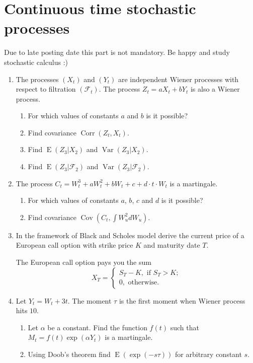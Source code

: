\documentclass[12pt]{article}
\DeclareMathOperator{\Cov}{Cov}
\DeclareMathOperator{\Corr}{Corr}
\DeclareMathOperator{\Var}{Var}
\DeclareMathOperator{\E}{E}
\begin{document}
\newpage
\section{Continuous time stochastic processes}

Due to late posting date this part is not mandatory. Be happy and study stochastic calculus :)

\begin{enumerate}

\item The processes $(X_t)$ and $(Y_t)$ are independent Wiener processes with respect to filtration $(\mathcal{F}_t)$.
The process $Z_t = aX_t + b Y_t$ is also a Wiener process. 
\begin{enumerate}
  \item For which values of constants $a$ and $b$ is it possible?
  \item Find covariance $\Corr(Z_t, X_t)$.
  \item Find $\E(Z_3 | X_2)$ and $\Var(Z_3 | X_2)$.
  \item Find $\E(Z_3 | \mathcal{F}_2)$ and $\Var(Z_3 | \mathcal{F}_2)$.
\end{enumerate}


\item The process $C_t = W_t^3 + aW_t^2 +b W_t + c + d\cdot t\cdot W_t$ is a martingale.
\begin{enumerate}
  \item For which values of constants $a$, $b$, $c$ and $d$ is it possible?
  \item Find covariance $\Cov(C_t, \int W^2_u dW_u)$.
\end{enumerate}

\item In the framework of Black and Scholes model derive the current price of a European call option with 
strike price $K$ and maturity date $T$. 

The European call option pays you the sum
\[
X_T =   \begin{cases}
S_T - K, \text{ if } S_T > K; \\
0, \text{ otherwise.}
\end{cases}
\]

\item Let $Y_t = W_t + 3t$. The moment $\tau$ is the first moment when Wiener process hits $10$. 
\begin{enumerate}
  \item Let $\alpha$ be a constant. Find the function $f(t)$ such that $M_t = f(t)\exp(\alpha Y_t)$ is a martingale.
  \item Using Doob's theorem find $\E(\exp(-s \tau))$ for arbitrary constant $s$. 
\end{enumerate}


\end{enumerate}
\end{document}
